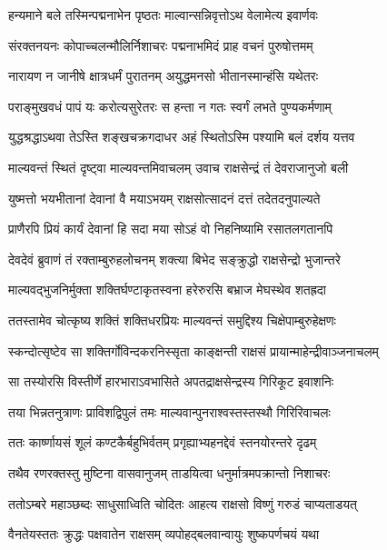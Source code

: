 
\twolineshloka
{हन्यमाने बले तस्मिन्पद्मनाभेन पृष्ठतः}
{माल्वान्सन्निवृत्तोऽथ वेलामेत्य इवार्णवः} %

\twolineshloka
{संरक्तनयनः कोपाच्चलन्मौलिर्निशाचरः}
{पद्मनाभमिदं प्राह वचनं पुरुषोत्तमम्} %

\twolineshloka
{नारायण न जानीषे क्षात्रधर्मं पुरातनम्}
{अयुद्धमनसो भीतानस्मान्हंसि यथेतरः} %

\twolineshloka
{पराङ्मुखवधं पापं यः करोत्यसुरेतरः}
{स हन्ता न गतः स्वर्गं लभते पुण्यकर्मणाम्} %

\twolineshloka
{युद्धश्रद्धाऽथवा तेऽस्ति शङ्खचक्रगदाधर}
{अहं स्थितोऽस्मि पश्यामि बलं दर्शय यत्तव} %

\twolineshloka
{माल्यवन्तं स्थितं दृष्ट्वा माल्यवन्तमिवाचलम्}
{उवाच राक्षसेन्द्रं तं देवराजानुजो बली} %

\twolineshloka
{युष्मत्तो भयभीतानां देवानां वै मयाऽभयम्}
{राक्षसोत्सादनं दत्तं तदेतदनुपाल्यते} %

\twolineshloka
{प्राणैरपि प्रियं कार्यं देवानां हि सदा मया}
{सोऽहं वो निहनिष्यामि रसातलगतानपि} %

\twolineshloka
{देवदेवं ब्रुवाणं तं रक्ताम्बुरुहलोचनम्}
{शक्त्या बिभेद सङ्क्रुद्धो राक्षसेन्द्रो भुजान्तरे} %

\twolineshloka
{माल्यवद्भुजनिर्मुक्ता शक्तिर्घण्टाकृतस्वना}
{हरेरुरसि बभ्राज मेघस्थेव शतह्रदा} %

\twolineshloka
{ततस्तामेव चोत्कृष्य शक्तिं शक्तिधरप्रियः}
{माल्यवन्तं समुद्दिश्य चिक्षेपाम्बुरुहेक्षणः} %

\twolineshloka
{स्कन्दोत्सृष्टेव सा शक्तिर्गोविन्दकरनिस्सृता}
{काङ्क्षन्ती राक्षसं प्रायान्माहेन्द्रीवाञ्जनाचलम्} %

\twolineshloka
{सा तस्योरसि विस्तीर्णे हारभाराऽवभासिते}
{अपतद्राक्षसेन्द्रस्य गिरिकूट इवाशनिः} %

\twolineshloka
{तया भिन्नतनुत्राणः प्राविशद्विपुलं तमः}
{माल्यवान्पुनराश्वस्तस्तस्थौ गिरिरिवाचलः} %

\twolineshloka
{ततः कार्ष्णायसं शूलं कण्टकैर्बहुभिर्वतम्}
{प्रगृह्याभ्यहनद्देवं स्तनयोरन्तरे दृढम्} %

\twolineshloka
{तथैव रणरक्तस्तु मुष्टिना वासवानुजम्}
{ताडयित्वा धनुर्मात्रमपक्रान्तो निशाचरः} %

\twolineshloka
{ततोऽम्बरे महाञ्छब्दः साधुसाध्विति चोदितः}
{आहत्य राक्षसो विष्णुं गरुडं चाप्यताडयत्} %

\twolineshloka
{वैनतेयस्ततः क्रुद्धः पक्षवातेन राक्षसम्}
{व्यपोहद्बलवान्वायुः शुष्कपर्णचयं यथा} %

